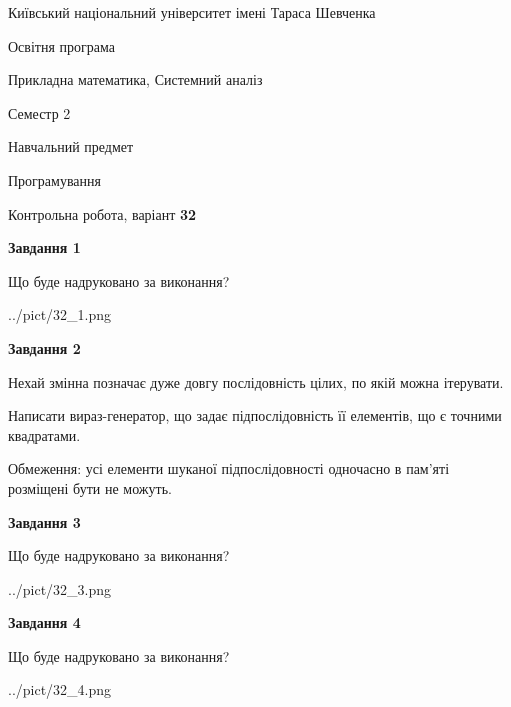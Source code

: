 \documentclass[12pt, ukrainian]{article}
\begin{document}
{{\begin {small}\par
{ \center  Київський національний університет імені Тараса Шевченка \par}
{\parbox {5 cm}{Освітня програма \hfill}{\parbox {8 cm}{Прикладна математика, Системний аналіз \hfill}}\parbox {5 cm}{\hfill Семестр 2}}\par
{\parbox {5 cm} {Навчальний предмет \hfill}\parbox {7 cm}{Програмування \hfill}\parbox {6cm}{\hfill}\par}\vspace{-7pt} \end{small}}{\center Контрольна робота, варіант  \No \textbf
{ 32 }\par}}
{
\begin {large}
{\begin {center}\textbf{Завдання 1}\end {center}}\par
Що буде надруковано за виконання?\par\par
\begin{center}
	{../pict/32_1.png}
\end{center}
\newpage

{\begin {center}\textbf{Завдання 2}\end {center}}\par
Нехай змінна  позначає дуже довгу послідовність цілих, по якій можна ітерувати.

Написати вираз-генератор, що задає підпослідовність її елементів, що є точними квадратами.

Обмеження: усі елементи шуканої підпослідовності одночасно в пам'яті розміщені бути не можуть.\par
\newpage

{\begin {center}\textbf{Завдання 3}\end {center}}\par
Що буде надруковано за виконання?\par
\begin{center}
	{../pict/32_3.png}
\end{center}
\newpage

{\begin {center}\textbf{Завдання 4}\end {center}}\par
Що буде надруковано за виконання?\par
\begin{center}
	{../pict/32_4.png}
\end{center}
\newpage


\end{large}}
\end{document}
